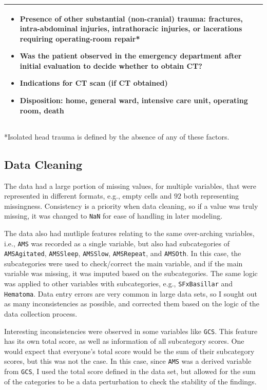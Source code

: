 \documentclass[10pt,letterpaper]{article}
\begin{document}
\begin{table}[htbp]
\begin{tabularx}{\textwidth}{>{\bfseries\hsize=0.3\hsize}X X}
\begin{itemize}[leftmargin=*, nosep]
    \item Presence of other substantial (non-cranial) trauma: fractures, intra-abdominal injuries, intrathoracic injuries, or lacerations requiring operating-room repair*
    \item Was the patient observed in the emergency department after initial evaluation to decide whether to obtain CT?
    \item Indications for CT scan (if CT obtained)
    \item Disposition: home, general ward, intensive care unit, operating room, death
\end{itemize} \\
\bottomrule
\end{tabularx}
\vspace{4pt}

\raggedright\footnotesize{*Isolated head trauma is defined by the absence of any of these factors.}
\end{table}

\subsection{Data Cleaning}\label{data-cleaning}

The data had a large portion of missing values, for multiple variables, that were represented in different formats, e.g., empty cells and $92$ both representing missingness. Consistency is a priority when data cleaning, so if a value was truly missing, it was changed to \texttt{NaN} for ease of handling in later modeling.

The data also had mutliple features relating to the same over-arching variables, i.e., \texttt{AMS} was recorded as a single variable, but also had subcategories of \texttt{AMSAgitated}, \texttt{AMSSleep}, \texttt{AMSSlow}, \texttt{AMSRepeat}, and \texttt{AMSOth}. In this case, the subcategories were used to check/correct the main variable, and if the main variable was missing, it was imputed based on the subcategories. The same logic was applied to other variables with subcategories, e.g., \texttt{SFxBasillar} and \texttt{Hematoma}. Data entry errors are very common in large data sets, so I sought out as many inconsistencies as possible, and corrected them based on the logic of the data collection process. 

Interesting inconsistencies were observed in some variables like \texttt{GCS}. This feature has its own total score, as well as information of all subcategory scores. One would expect that everyone's total score would be the sum of their subcategory scores, but this was not the case. In this case, since \texttt{AMS} was a derived variable from \texttt{GCS}, I used the total score defined in the data set, but allowed for the sum of the categories to be a data perturbation to check the stability of the findings.
\end{document}
